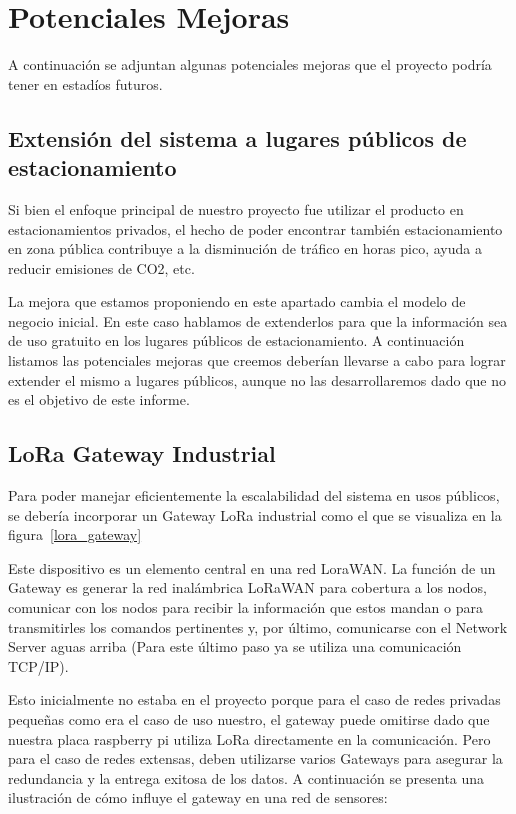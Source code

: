 \clearpage
\section{Potenciales Mejoras}
A continuación se adjuntan algunas potenciales mejoras que el proyecto podría tener en estadíos futuros.

\subsection{Extensión del sistema a lugares públicos de estacionamiento}

Si bien el enfoque principal de nuestro proyecto fue utilizar el producto en estacionamientos privados, el hecho de poder encontrar también estacionamiento en zona pública contribuye a la disminución de tráfico en horas pico, ayuda a reducir emisiones de CO2, etc. 

La mejora que estamos proponiendo en este apartado cambia el modelo de negocio inicial. En este caso hablamos de extenderlos para que la información sea de uso gratuito en los lugares públicos de estacionamiento. A continuación listamos las potenciales mejoras que creemos deberían llevarse a cabo para lograr extender el mismo a lugares públicos, aunque no las desarrollaremos dado que no es el objetivo de este informe.

\subsection{LoRa Gateway Industrial}
Para poder manejar eficientemente la escalabilidad del sistema en usos públicos, se debería incorporar un Gateway LoRa industrial como el que se visualiza en la figura~\ref{lora_gateway} 


Este dispositivo es un elemento central en una red LoraWAN. La función de un Gateway es generar la red inalámbrica LoRaWAN para cobertura a los nodos, comunicar con los nodos para recibir la información que estos mandan o para transmitirles los comandos pertinentes y, por último, comunicarse con el Network Server aguas arriba (Para este último paso ya se utiliza una comunicación TCP/IP). 

Esto inicialmente no estaba en el proyecto porque para el caso de redes privadas pequeñas como era el caso de uso nuestro, el gateway puede omitirse dado que nuestra placa raspberry pi utiliza LoRa directamente en la comunicación. Pero para el caso de redes extensas, deben utilizarse varios Gateways para asegurar la redundancia y la entrega exitosa de los datos. A continuación se presenta una ilustración de cómo influye el gateway en una red de sensores: 

